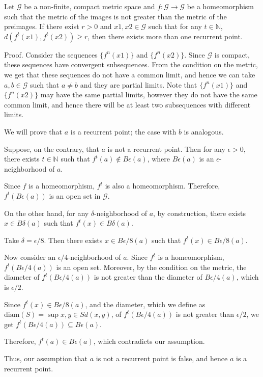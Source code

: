 
Let $\mathcal{G}$ be a non-finite, compact metric space and $f: \mathcal{G} \to \mathcal{G}$ be a homeomorphism such that the metric of the images is not greater than the metric of the preimages. If there exist $r > 0$ and $x1, x2 \in \mathcal{G}$ such that for any $t \in \mathbb{N}$, $d(f^t(x1), f^t(x2)) \geq r$, then there exists more than one recurrent point.

Proof. Consider the sequences $\{ f^n(x1) \}$ and $\{ f^n(x2) \}$. Since $\mathcal{G}$ is compact, these sequences have convergent subsequences. From the condition on the metric, we get that these sequences do not have a common limit, and hence we can take $a, b \in \mathcal{G}$ such that $a \neq b$ and they are partial limits. Note that $\{ f^n(x1) \}$ and $\{ f^n(x2) \}$ may have the same partial limits, however they do not have the same common limit, and hence there will be at least two subsequences with different limits.

We will prove that $a$ is a recurrent point; the case with $b$ is analogous.

Suppose, on the contrary, that $a$ is not a recurrent point. Then for any $\epsilon > 0$, there exists $t \in \mathbb{N}$ such that $f^t(a) \notin B\epsilon(a)$, where $B\epsilon(a)$ is an $\epsilon$-neighborhood of $a$.

Since $f$ is a homeomorphism, $f^t$ is also a homeomorphism. Therefore, $f^t(B\epsilon(a))$ is an open set in $\mathcal{G}$.

On the other hand, for any $\delta$-neighborhood of $a$, by construction, there exists $x \in B\delta(a)$ such that $f^t(x) \in B\delta(a)$.

Take $\delta = \epsilon/8$. Then there exists $x \in B{\epsilon/8}(a)$ such that $f^t(x) \in B{\epsilon/8}(a)$.

Now consider an $\epsilon/4$-neighborhood of $a$. Since $f^t$ is a homeomorphism, $f^t(B{\epsilon/4}(a))$ is an open set. Moreover, by the condition on the metric, the diameter of $f^t(B{\epsilon/4}(a))$ is not greater than the diameter of $B{\epsilon/4}(a)$, which is $\epsilon/2$.

Since $f^t(x) \in B{\epsilon/8}(a)$, and the diameter, which we define as $\mathrm{diam}(S) = \sup{x, y \in S} d(x, y)$, of $f^t(B{\epsilon/4}(a))$ is not greater than $\epsilon/2$, we get $f^t(B{\epsilon/4}(a)) \subseteq B\epsilon(a)$.

Therefore, $f^t(a) \in B\epsilon(a)$, which contradicts our assumption.

Thus, our assumption that $a$ is not a recurrent point is false, and hence $a$ is a recurrent point.


